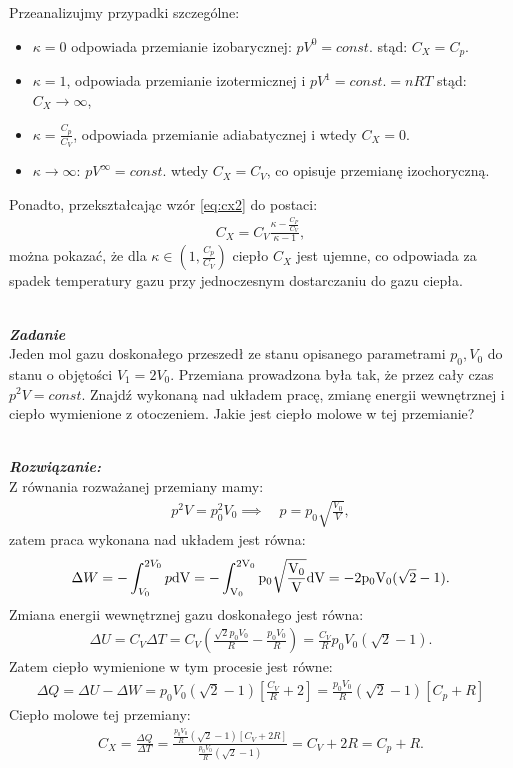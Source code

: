 \documentclass[11pt,a4paper]{article}
\newcounter{zadanie}\newcommand{\zadanie}[1][]{\addtocounter{zadanie}{1} ~\\  {\bf \emph{Zadanie \arabic{zadanie} #1 }} \\}
\newcounter{rozwiazanie}\newcommand{\rozwiazanie}[1][]{\addtocounter{rozwiazanie}{1} ~\\  {\bf \emph{Rozwiązanie: }} \\}
\begin{document}
Przeanalizujmy przypadki szczególne:
\begin{itemize}
\item $\kappa = 0$  odpowiada przemianie izobarycznej:  $pV^{0} = const.$ stąd: $C_X = C_p$.
\item $\kappa =1$, odpowiada przemianie izotermicznej i   $pV^{1} = const.= nRT$  stąd: $C_X \rightarrow \infty$,
\item $\kappa = \frac{C_p}{C_V}$, odpowiada przemianie adiabatycznej i wtedy $C_X = 0$.
\item $\kappa \rightarrow \infty$: $pV^{\infty} = const. $ wtedy $C_X = C_V$, co opisuje przemianę izochoryczną.
\end{itemize}

\vspace{1cm}
Ponadto, przekształcając wzór \eqref{eq:cx2} do postaci:
\begin{align}
C_X =C_V \frac{\kappa - \frac{C_P}{C_V}}{\kappa-1},
\end{align}
można pokazać, że dla $\kappa \in  \left( 1,\frac{C_p}{C_V}\right)$ ciepło $C_X$ jest ujemne, co odpowiada za spadek temperatury gazu przy  jednoczesnym dostarczaniu do gazu ciepła. 

\newpage
\zadanie
Jeden mol gazu doskonałego przeszedł ze stanu opisanego parametrami
$p_0, V_0$ do stanu o objętości $V_1 = 2 V_0$.
Przemiana prowadzona była tak, że przez cały czas $p^2 V = const$.
Znajdź wykonaną nad układem pracę, zmianę energii wewnętrznej i ciepło wymienione z otoczeniem.
Jakie jest ciepło molowe w tej przemianie?
\vspace{5mm}
\rozwiazanie 

Z równania rozważanej przemiany mamy:
\begin{align}
p^2 V = p_0^2 V_0 \implies \quad p = p_0 \sqrt{\frac{V_0}{V}},
\end{align}
zatem praca wykonana nad układem jest równa:
\begin{align}
\Delta W = - \int_{V_0}^{2 V_0} p \rm{d} V =  - \int_{V_0}^{2 V_0}  p_0 \sqrt{\frac{V_0}{V}} \rm{d} V  = - 2 p_0 V_0 (\sqrt{2}-1).
\end{align}
Zmiana energii wewnętrznej gazu doskonałego jest równa:
\begin{align}
\Delta U =   C_V \Delta T = C_V \left( \frac{\sqrt{2}p_0 V_0}{R} -  \frac{p_0 V_0}{R} \right) = \frac{C_V}{R} p_0 V_0 ( \sqrt{2}-1).
\end{align}
Zatem ciepło wymienione w tym procesie jest równe:
\begin{align}
\Delta Q = \Delta U - \Delta W = p_0 V_0{(\sqrt{2}-1)\left[ \frac{C_V}{R} + 2 \right]} = \frac{p_0 V_0}{R}(\sqrt{2}-1) \left[ C_p + R\right]
\end{align}
Ciepło molowe tej przemiany:
\begin{align}
C_X = \frac{\Delta Q}{\Delta T } = \frac{ \frac{p_0 V_0}{R}(\sqrt{2}-1) \left[ C_V + 2 R\right]}{\frac{p_0 V_0}{R}(\sqrt{2}-1)}= C_V + 2 R = C_p + R.
\end{align}
\end{document}
